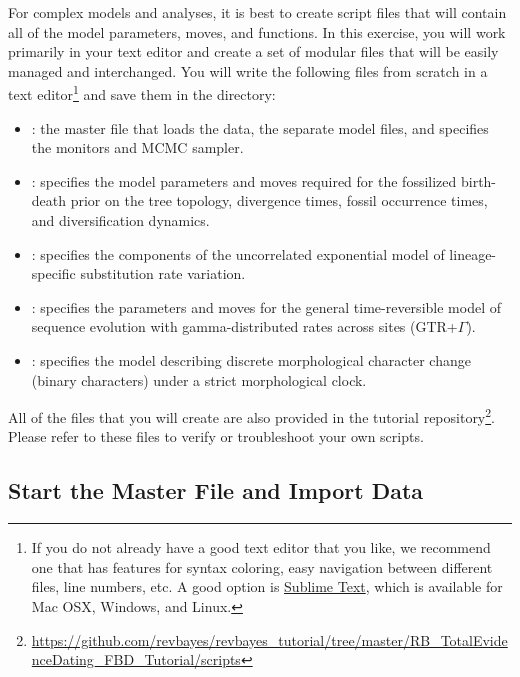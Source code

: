 For complex models and analyses, it is best to create \Rev script files that will contain all of the model parameters, moves, and functions. 
In this exercise, you will work primarily in your text editor and create a set of modular files that will be easily managed and interchanged.
You will write the following files from scratch in a text editor\footnote{If you do not already have a good text editor that you like, we recommend one that has features for syntax coloring, easy navigation between different files, line numbers, etc.
A good option is \href{http://www.sublimetext.com/}{Sublime Text}, which is available for Mac OSX, Windows, and Linux.} and save them in the  directory:
\begin{itemize}[noitemsep,topsep=0pt]
\item {}: the master \Rev file that loads the data, the separate model files, and specifies the monitors and MCMC sampler.
\item {}: specifies the model parameters and moves required for the fossilized birth-death prior on the tree topology, divergence times, fossil occurrence times, and diversification dynamics.
\item {}: specifies the components of the uncorrelated exponential model of lineage-specific substitution rate variation.
\item {}: specifies the parameters and moves for the general time-reversible model of sequence evolution with gamma-distributed rates across sites (GTR+$\Gamma$).
\item {}: specifies the model describing discrete morphological character change (binary characters) under a strict morphological clock. 
\end{itemize}

All of the files that you will create are also provided in the \RevBayes tutorial repository\footnote{\url{https://github.com/revbayes/revbayes_tutorial/tree/master/RB_TotalEvidenceDating_FBD_Tutorial/scripts}}. 
Please refer to these files to verify or troubleshoot your own scripts. 


\bigskip
\subsection{Start the Master \Rev File and Import Data}\label{subsect:RB-StartMasterRev}



